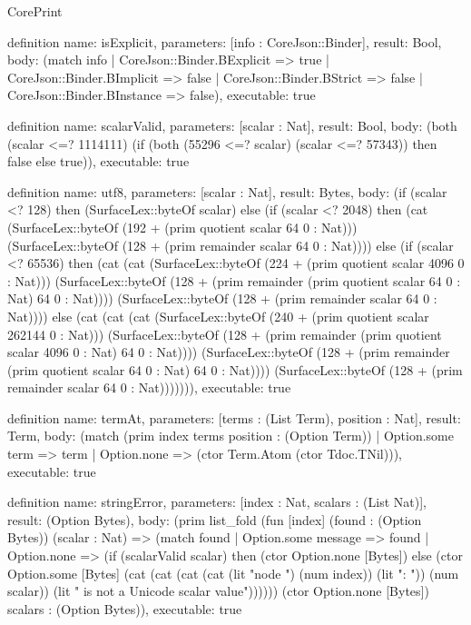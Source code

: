 \begin{lexlean}{CorePrint}
\begin{semanticmodule}
definition{
  name: isExplicit,
  parameters: [info : CoreJson::Binder],
  result: Bool,
  body: (match info
    | CoreJson::Binder.BExplicit => true
    | CoreJson::Binder.BImplicit => false
    | CoreJson::Binder.BStrict => false
    | CoreJson::Binder.BInstance => false),
  executable: true
}

definition{
  name: scalarValid,
  parameters: [scalar : Nat],
  result: Bool,
  body: (both (scalar <=? 1114111) (if (both (55296 <=? scalar) (scalar <=? 57343)) then false else true)),
  executable: true
}

definition{
  name: utf8,
  parameters: [scalar : Nat],
  result: Bytes,
  body: (if (scalar <? 128) then (SurfaceLex::byteOf scalar) else (if (scalar <? 2048) then (cat (SurfaceLex::byteOf (192 + (prim quotient scalar 64 0 : Nat))) (SurfaceLex::byteOf (128 + (prim remainder scalar 64 0 : Nat)))) else (if (scalar <? 65536) then (cat (cat (SurfaceLex::byteOf (224 + (prim quotient scalar 4096 0 : Nat))) (SurfaceLex::byteOf (128 + (prim remainder (prim quotient scalar 64 0 : Nat) 64 0 : Nat)))) (SurfaceLex::byteOf (128 + (prim remainder scalar 64 0 : Nat)))) else (cat (cat (cat (SurfaceLex::byteOf (240 + (prim quotient scalar 262144 0 : Nat))) (SurfaceLex::byteOf (128 + (prim remainder (prim quotient scalar 4096 0 : Nat) 64 0 : Nat)))) (SurfaceLex::byteOf (128 + (prim remainder (prim quotient scalar 64 0 : Nat) 64 0 : Nat)))) (SurfaceLex::byteOf (128 + (prim remainder scalar 64 0 : Nat))))))),
  executable: true
}

definition{
  name: termAt,
  parameters: [terms : (List Term), position : Nat],
  result: Term,
  body: (match (prim index terms position : (Option Term))
    | Option.some term => term
    | Option.none => (ctor Term.Atom (ctor Tdoc.TNil))),
  executable: true
}

definition{
  name: stringError,
  parameters: [index : Nat, scalars : (List Nat)],
  result: (Option Bytes),
  body: (prim list_fold (fun [index] (found : (Option Bytes)) (scalar : Nat) => (match found
    | Option.some message => found
    | Option.none => (if (scalarValid scalar) then (ctor Option.none [Bytes]) else (ctor Option.some [Bytes] (cat (cat (cat (cat (lit "node ") (num index)) (lit ": ")) (num scalar)) (lit " is not a Unicode scalar value")))))) (ctor Option.none [Bytes]) scalars : (Option Bytes)),
  executable: true
}


\end{semanticmodule}
\end{lexlean}

